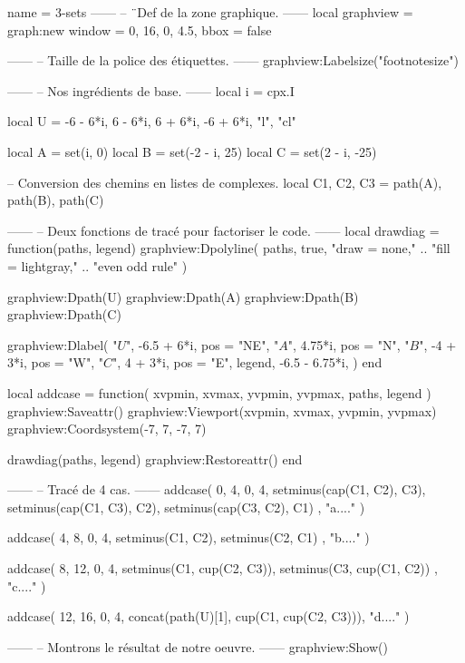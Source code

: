 \documentclass[border = 3pt]{standalone}
\begin{document}
\begin{luadraw}{name = 3-sets}
------
-- ¨Def de la zone graphique.
------
local graphview = graph:new{
  window = {0, 16, 0, 4.5},
  bbox   = false
}

------
-- Taille de la police des étiquettes.
------
graphview:Labelsize("footnotesize")

------
-- Nos ingrédients de base.
------
local i = cpx.I

local U = {
  -6 - 6*i, 6 - 6*i, 6 + 6*i, -6 + 6*i,
  "l",
  "cl"
}

local A = set(i, 0)
local B = set(-2 - i, 25)
local C = set(2 - i, -25)

-- Conversion des chemins en listes de complexes.
local C1, C2, C3 = path(A), path(B), path(C)

------
-- Deux fonctions de tracé pour factoriser le code.
------
local drawdiag = function(paths, legend)
  graphview:Dpolyline(
    paths,
    true,
       "draw = none,"
    .. "fill = lightgray,"
    .. "even odd rule"
  )

  graphview:Dpath(U)
  graphview:Dpath(A)
  graphview:Dpath(B)
  graphview:Dpath(C)

  graphview:Dlabel(
    "$U$", -6.5 + 6*i, {pos = "NE"},
    "$A$", 4.75*i, {pos = "N"},
    "$B$", -4 + 3*i, {pos = "W"},
    "$C$", 4 + 3*i, {pos = "E"},
    legend, -6.5 - 6.75*i, {}
  )
end

local addcase = function(
    xvpmin, xvmax, yvpmin, yvpmax,
    paths,
    legend
)
  graphview:Saveattr()
    graphview:Viewport(xvpmin, xvmax, yvpmin, yvpmax)
    graphview:Coordsystem(-7, 7, -7, 7)

    drawdiag(paths, legend)
  graphview:Restoreattr()
end

------
-- Tracé de 4 cas.
------
addcase(
  0, 4, 0, 4,
  {
    setminus(cap(C1, C2), C3),
    setminus(cap(C1, C3), C2),
    setminus(cap(C3, C2), C1)
  },
  "a...."
)

addcase(
  4, 8, 0, 4,
  {
    setminus(C1, C2),
    setminus(C2, C1)
  },
  "b...."
)

addcase(
  8, 12, 0, 4,
  {
    setminus(C1, cup(C2, C3)),
    setminus(C3, cup(C1, C2))
  },
  "c...."
)

addcase(
  12, 16, 0, 4,
  concat(path(U)[1], cup(C1, cup(C2, C3))),
  "d...."
)

------
-- Montrons le résultat de notre oeuvre.
------
graphview:Show()
\end{luadraw}
\end{document}
